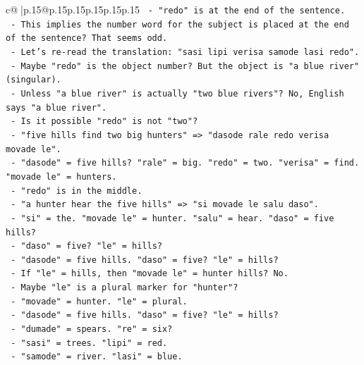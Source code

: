 \documentclass{article}
\begin{document}
{\begin{supertabular}{c@{$\;$}|p{.15\linewidth}@{}p{.15\linewidth}p{.15\linewidth}p{.15\linewidth}p{.15\linewidth}p{.15\linewidth}}
{{{\texttt{                      {-} "redo" is at the end of the sentence.} \\
\texttt{                      {-} This implies the number word for the subject is placed at the end of the sentence? That seems odd.} \\
\texttt{                      {-} Let's re{-}read the translation: "sasi lipi verisa samode lasi redo".} \\
\texttt{                      {-} Maybe "redo" is the object number? But the object is "a blue river" (singular).} \\
\texttt{                      {-} Unless "a blue river" is actually "two blue rivers"? No, English says "a blue river".} \\
\texttt{                      {-} Is it possible "redo" is not "two"?} \\
\texttt{                      {-} "five hills find two big hunters" => "dasode rale redo verisa movade le".} \\
\texttt{                        {-} "dasode" = five hills? "rale" = big. "redo" = two. "verisa" = find. "movade le" = hunters.} \\
\texttt{                        {-} "redo" is in the middle.} \\
\texttt{                      {-} "a hunter hear the five hills" => "si movade le salu daso".} \\
\texttt{                        {-} "si" = the. "movade le" = hunter. "salu" = hear. "daso" = five hills?} \\
\texttt{                        {-} "daso" = five? "le" = hills?} \\
\texttt{                        {-} "dasode" = five hills. "daso" = five? "le" = hills?} \\
\texttt{                        {-} If "le" = hills, then "movade le" = hunter hills? No.} \\
\texttt{                        {-} Maybe "le" is a plural marker for "hunter"?} \\
\texttt{                        {-} "movade" = hunter. "le" = plural.} \\
\texttt{                        {-} "dasode" = five hills. "daso" = five? "le" = hills?} \\
\texttt{                        {-} "dumade" = spears. "re" = six?} \\
\texttt{                        {-} "sasi" = trees. "lipi" = red.} \\
\texttt{                        {-} "samode" = river. "lasi" = blue.} \\
}}}
\end{supertabular}}
\end{document}
